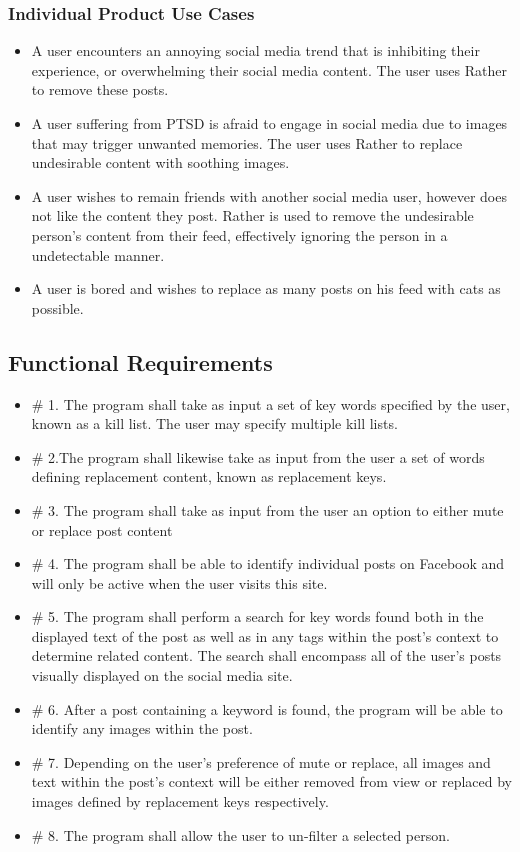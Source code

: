 \documentclass[12pt, titlepage]{article}
\begin{document}
\subsubsection{Individual Product Use Cases}
\begin{itemize}
  \item A user encounters an annoying social media trend that is inhibiting their experience, or overwhelming their social media content. The user uses Rather to remove these posts.
  \item A user suffering from PTSD is afraid to engage in social media due to images that may trigger unwanted memories. The user uses Rather to replace undesirable content with soothing images.
  \item A user wishes to remain friends with another social media user, however does not like the content they post. Rather is used to remove the undesirable person's content from their feed, effectively ignoring the person in a %
   undetectable manner.
  \item A user is bored and wishes to replace as many posts on his feed with cats as possible.
  
\end{itemize}

\subsection{Functional Requirements}
\begin{itemize}
  \item \# 1. The program shall take as input a set of key words specified by the user, known as a kill list. The user may specify multiple kill lists.
  \item  \# 2.The program shall likewise take as input from the user a set of words defining replacement content, known as replacement keys.
  \item \# 3. The program shall take as input from the user an option to either mute or replace post content
  \item \# 4. The program shall be able to identify individual posts on Facebook and will only be active when the user visits this site.
  \item \# 5. The program shall perform a search for key words found both in the displayed text of the post as well as in any tags within the post's context to determine related content. The search shall encompass all of the user's posts visually displayed on the social media site.
  \item \# 6. After a post containing a keyword is found, the program will be able to identify any images within the post.
  \item \# 7. Depending on the user's preference of mute or replace, all images and text within the post's context will be either removed from view or replaced by images defined by replacement keys respectively.
  \item \# 8. The program shall allow the user to un-filter a selected person.
\end{itemize}
\end{document}
